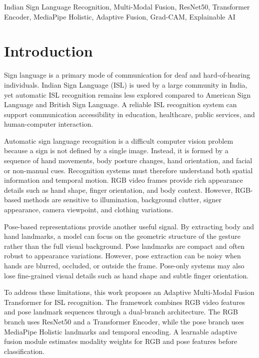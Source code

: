 \documentclass[conference]{IEEEtran}
\begin{document}
\begin{IEEEkeywords}
Indian Sign Language Recognition, Multi-Modal Fusion, ResNet50, Transformer Encoder, MediaPipe Holistic, Adaptive Fusion, Grad-CAM, Explainable AI
\end{IEEEkeywords}

\section{Introduction}

Sign language is a primary mode of communication for deaf and hard-of-hearing individuals. Indian Sign Language (ISL) is used by a large community in India, yet automatic ISL recognition remains less explored compared to American Sign Language and British Sign Language. A reliable ISL recognition system can support communication accessibility in education, healthcare, public services, and human-computer interaction.

Automatic sign language recognition is a difficult computer vision problem because a sign is not defined by a single image. Instead, it is formed by a sequence of hand movements, body posture changes, hand orientation, and facial or non-manual cues. Recognition systems must therefore understand both spatial information and temporal motion. RGB video frames provide rich appearance details such as hand shape, finger orientation, and body context. However, RGB-based methods are sensitive to illumination, background clutter, signer appearance, camera viewpoint, and clothing variations.

Pose-based representations provide another useful signal. By extracting body and hand landmarks, a model can focus on the geometric structure of the gesture rather than the full visual background. Pose landmarks are compact and often robust to appearance variations. However, pose extraction can be noisy when hands are blurred, occluded, or outside the frame. Pose-only systems may also lose fine-grained visual details such as hand shape and subtle finger orientation.

To address these limitations, this work proposes an Adaptive Multi-Modal Fusion Transformer for ISL recognition. The framework combines RGB video features and pose landmark sequences through a dual-branch architecture. The RGB branch uses ResNet50 and a Transformer Encoder, while the pose branch uses MediaPipe Holistic landmarks and temporal encoding. A learnable adaptive fusion module estimates modality weights for RGB and pose features before classification.
\end{document}

